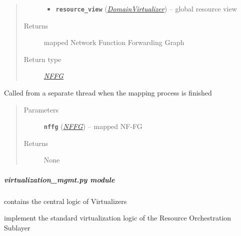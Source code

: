 \documentclass[letterpaper,10pt,english]{sphinxmanual}
\begin{document}
\begin{fulllineitems}
\begin{fulllineitems}
\begin{quote}
\begin{description}
\begin{itemize}
\item {} 
\textbf{\texttt{resource\_view}} ({\hyperref[adapt/adaptation:escape.adapt.adaptation.DomainVirtualizer]{\emph{\emph{DomainVirtualizer}}}}) -- global resource view

\end{itemize}

\item[{Returns}] \leavevmode
mapped Network Function Forwarding Graph

\item[{Return type}] \leavevmode
{\hyperref[util/nffg:escape.util.nffg.NFFG]{\emph{NFFG}}}

\end{description}\end{quote}

\end{fulllineitems}


\begin{fulllineitems}
\label{orchest/ros_mapping:escape.orchest.ros_mapping.ResourceOrchestrationMapper._mapping_finished}
Called from a separate thread when the mapping process is finished
\begin{quote}\begin{description}
\item[{Parameters}] \leavevmode
\textbf{\texttt{nffg}} ({\hyperref[util/nffg:escape.util.nffg.NFFG]{\emph{\emph{NFFG}}}}) -- mapped NF-FG

\item[{Returns}] \leavevmode
None

\end{description}\end{quote}

\end{fulllineitems}


\end{fulllineitems}



\subparagraph{\emph{virtualization\_mgmt.py} module}
\label{orchest/virtualization_mgmt::doc}\label{orchest/virtualization_mgmt:virtualization-mgmt-py-module}
{\hyperref[orchest/virtualization_mgmt:escape.orchest.virtualization_mgmt.AbstractVirtualizer]{\emph{}}} contains the  central logic of Virtualizers

{\hyperref[orchest/virtualization_mgmt:escape.orchest.virtualization_mgmt.ESCAPEVirtualizer]{\emph{}}} implement the standard virtualization logic of the
Resource Orchestration Sublayer
\end{document}
